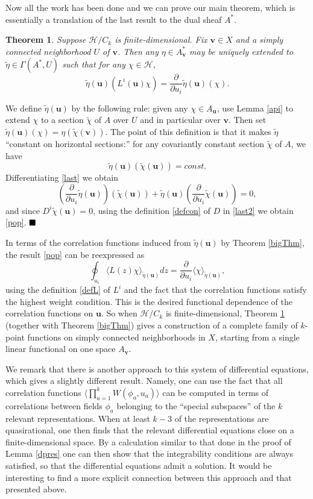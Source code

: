 \documentclass[a4paper,12pt]{article}
\newcommand{\uu}{{\mathbf u}}
\newcommand{\vv}{{\mathbf v}}
\newcommand{\F}{{\mathcal H}}
\newcommand{\IP}[1]{\langle#1\rangle}
\newcommand{\done}{$\hfill \hfill \blacksquare$ \bigskip}
\newcommand{\dwrt}[1]{\frac{\partial}{\partial#1}}
\newcommand{\chit}{\tilde{\chi}}
\newcommand{\etat}{\tilde{\eta}}
\newtheorem{thm}[defn]{Theorem}
\newcommand{\oproof}[1]{\noindent {\bf Proof#1.\ }}
\begin{document}
Now all the work has been done and we can prove our main theorem, which is essentially a translation of the last result
to the dual sheaf $A^*$.
\begin{thm} \label{mainthm} Suppose $\F / C_k$ is finite-dimensional.  Fix $\vv \in X$ and a simply connected neighborhood $U$ of $\vv$.
Then any $\eta \in A_\vv^*$ may be uniquely extended to $\etat \in \Gamma(A^*, U)$ such that for any $\chi \in \F$,
\begin{equation} \label{pop}
\etat(\uu)(L^i(\uu) \chi) = \dwrt{u_i} \etat(\uu) (\chi).
\end{equation}
\end{thm}
\oproof{} We define $\etat(\uu)$ by the following rule:  given any $\chi \in A_\uu$, use Lemma \ref{api} to extend $\chi$ to a section $\chit$ of $A$
over $U$ and in particular over $\vv$.  Then set $\etat(\uu)(\chi) = \eta(\chit(\vv))$.  The point of this definition is that it
makes $\etat$ ``constant on horizontal sections:'' for any covariantly constant section $\chit$ of $A$, we have
\begin{equation} \label{last}
\etat(\uu) (\chit(\uu)) = const.
\end{equation}
Differentiating \eqref{last} we obtain
\begin{equation} \label{last2}
\left( \dwrt{u_i} \etat(\uu) \right) (\chit(\uu)) + \etat(\uu) \left( \dwrt{u_i} \chit(\uu) \right) = 0,
\end{equation}
and since $D^i \chit(\uu) = 0$, using the definition \eqref{defcon} of $D$ in \eqref{last2} we obtain \eqref{pop}. \done

In terms of the correlation functions induced from $\etat(\uu)$ by Theorem \ref{bigThm}, the result \eqref{pop} can be reexpressed as
\begin{equation}
\oint_{u_i} \IP{L(z) \chi}_{\etat(\uu)} dz = \dwrt{u_i} \IP{\chi}_{\etat(\uu)},
\end{equation}
using the definition \eqref{defL} of $L^i$ and the fact that the correlation
functions satisfy the highest weight condition.
This is the desired functional dependence of the correlation functions on $\uu$.  So when $\F/C_k$ is finite-dimensional,
Theorem \ref{mainthm} (together with Theorem \ref{bigThm}) 
gives a construction of a complete family of $k$-point functions on simply connected neighborhoods in $X$, 
starting from a single linear functional on one
space $A_\vv$.

We remark that there is another approach to this system of differential equations, which gives a slightly different
result.  Namely, one can use the fact that all correlation functions $\IP{\prod_{a=1}^k W(\phi_a, u_a)}$ can be computed
in terms of correlations between fields $\phi_a$ belonging to the ``special subspaces'' \cite{Nahm2} of the $k$ relevant 
representations.  When at least $k-3$ of the representations are quasirational, one then finds that
the relevant differential equations close on a finite-dimensional space.  By a calculation similar
to that done in the proof of Lemma \ref{dpres} one
can then show that the integrability conditions are always satisfied, so
that the differential equations admit a solution.
It would be interesting to find a more explicit connection between this approach
and that presented above.
\end{document}
